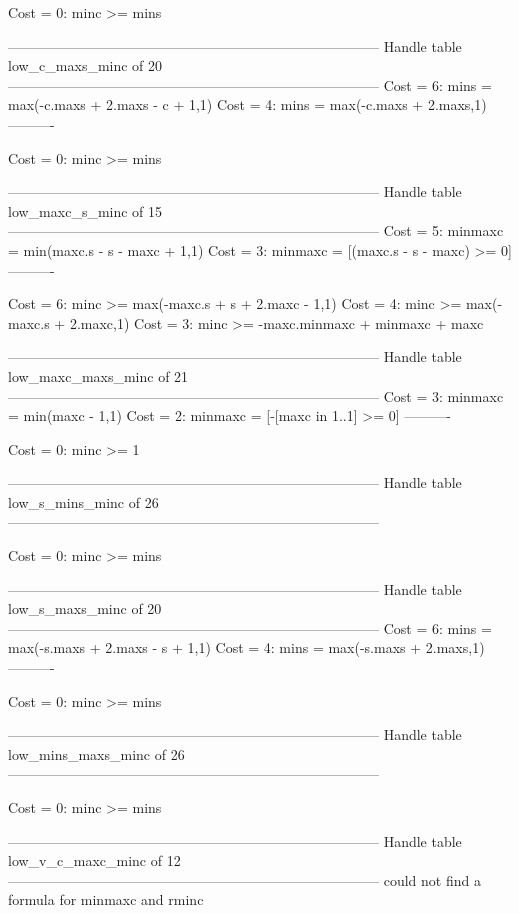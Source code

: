 Cost =  0:  minc >= mins

--------------------------------------------------------------------------------
Handle table low_c_maxs_minc of 20
--------------------------------------------------------------------------------
Cost =  6:  mins = max(-c.maxs + 2.maxs - c + 1,1)
Cost =  4:  mins = max(-c.maxs + 2.maxs,1)
----------

Cost =  0:  minc >= mins

--------------------------------------------------------------------------------
Handle table low_maxc_s_minc of 15
--------------------------------------------------------------------------------
Cost =  5:  minmaxc = min(maxc.s - s - maxc + 1,1)
Cost =  3:  minmaxc = [(maxc.s - s - maxc) >= 0]
----------

Cost =  6:  minc >= max(-maxc.s + s + 2.maxc - 1,1)
Cost =  4:  minc >= max(-maxc.s + 2.maxc,1)
Cost =  3:  minc >= -maxc.minmaxc + minmaxc + maxc

--------------------------------------------------------------------------------
Handle table low_maxc_maxs_minc of 21
--------------------------------------------------------------------------------
Cost =  3:  minmaxc = min(maxc - 1,1)
Cost =  2:  minmaxc = [-[maxc in 1..1] >= 0]
----------

Cost =  0:  minc >= 1

--------------------------------------------------------------------------------
Handle table low_s_mins_minc of 26
--------------------------------------------------------------------------------

Cost =  0:  minc >= mins

--------------------------------------------------------------------------------
Handle table low_s_maxs_minc of 20
--------------------------------------------------------------------------------
Cost =  6:  mins = max(-s.maxs + 2.maxs - s + 1,1)
Cost =  4:  mins = max(-s.maxs + 2.maxs,1)
----------

Cost =  0:  minc >= mins

--------------------------------------------------------------------------------
Handle table low_mins_maxs_minc of 26
--------------------------------------------------------------------------------

Cost =  0:  minc >= mins

--------------------------------------------------------------------------------
Handle table low_v_c_maxc_minc of 12
--------------------------------------------------------------------------------
could not find a formula for minmaxc and rminc

